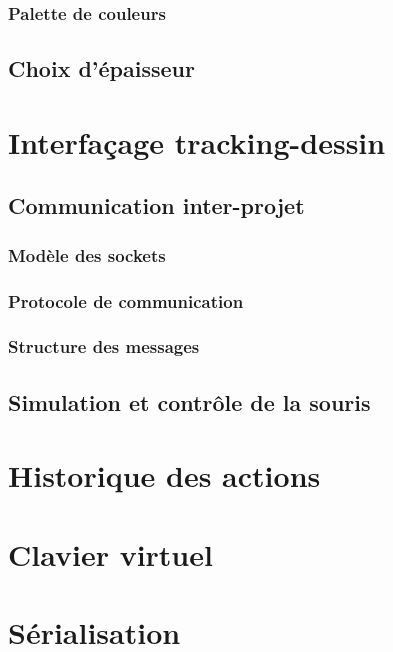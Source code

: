 \documentclass[11pt,a4paper,oldfontcommands]{memoir}
\begin{document}
\subsubsection{Palette de couleurs}

\subsection{Choix d'épaisseur}

\section{Interfaçage tracking-dessin}

\subsection{Communication inter-projet}

\subsubsection{Modèle des sockets}

\subsubsection{Protocole de communication}

\subsubsection{Structure des messages}

\subsection{Simulation et contrôle de la souris}

\section{Historique des actions}

\section{Clavier virtuel}

\section{Sérialisation}
\end{document}
